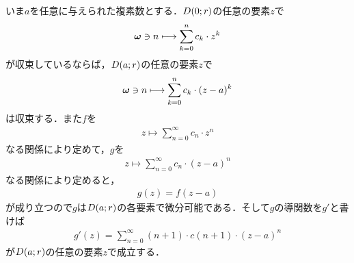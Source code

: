 	いま$a$を任意に与えられた複素数とする．$D(0;r)$の任意の要素$z$で
	\begin{align}
		{\boldsymbol \omega} \ni n \longmapsto \sum_{k=0}^{n} c_{k} \cdot z^{k}
	\end{align}
	が収束しているならば，$D(a;r)$の任意の要素$z$で
	\begin{align}
		{\boldsymbol \omega} \ni n \longmapsto \sum_{k=0}^{n} c_{k} \cdot (z-a)^{k}
	\end{align}
	は収束する．また$f$を
	\begin{align}
		z \longmapsto \sum_{n=0}^{\infty} c_{n} \cdot z^{n}
	\end{align}
	なる関係により定めて，$g$を
	\begin{align}
		z \longmapsto \sum_{n=0}^{\infty} c_{n} \cdot (z-a)^{n}
	\end{align}
	なる関係により定めると，
	\begin{align}
		g(z) = f(z-a)
	\end{align}
	が成り立つので$g$は$D(a;r)$の各要素で微分可能である．そして$g$の導関数を$g'$と書けば
	\begin{align}
		g'(z) = \sum_{n=0}^{\infty} (n+1) \cdot c(n+1) \cdot (z-a)^{n}
	\end{align}
	が$D(a;r)$の任意の要素$z$で成立する．